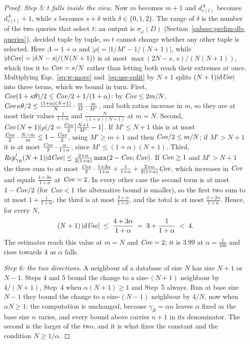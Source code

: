 \begin{proof}
\emph{Step 5: $t$ falls inside the view.}
Now $m$ becomes $m+1$ and $d^A_{v(t)}$ becomes $d^A_{v(t)}+1$, while $s$ becomes $s+\delta$ with
$\delta\in\{0,1,2\}$.
The range of $\delta$ is the number of the two queries that select $t$: an output is
$\sigma_\varphi(D)$ (Section~\ref{subsec:prelim-db-queries}), decided tuple by tuple, so $t$
cannot change whether any other tuple is selected.
Here $\Lambda=1+\alpha$ and $|\rho|=|1/M'-1/(N+1)|$, while $|\mathrm{d}\mathit{Cov}|=|\delta N-s|/(N(N+1))$
is at most $\max(2N-s,\,s)/(N(N+1))$, which ties it to $\mathit{Cov}=s/N$ rather than letting both reach
their extremes at once.
Multiplying Eqs.~\eqref{eq:w-move} and~\eqref{eq:use-split} by $N+1$ splits
$(N+1)|\mathrm{d}\mathit{Use}|$ into three terms, which we bound in turn.
First, $\mathit{Cov}(1+\kappa\theta)/2\le\mathit{Cov}/2+1/(1+\alpha)$: by $\mathit{Cov}\le2m/N$,
$\mathit{Cov}\,\kappa\theta/2\le\frac{(1+\alpha)(N+1)}{N}\cdot\frac{m}{M}\cdot\frac{m}{M'}$, and both ratios
increase in $m$, so they are at most their values $\frac1{1+\alpha}$ and
$\frac{N}{(1+\alpha)(N+1)}$ at $m=N$.
Second, $\mathit{Cov}\,(N+1)|\rho|/2=\frac{\mathit{Cov}}{2}\big|\frac{N+1}{M'}-1\big|$.
If $M'\le N+1$ this is at most $\frac{\mathit{Cov}}{2}\cdot\frac{N-m}{m}\le1-\frac{\mathit{Cov}}{2}$, using
$M'\ge m+1$ and then $\mathit{Cov}/2\le m/N$; if $M'>N+1$ it is at most
$\frac{\mathit{Cov}}{2}\cdot\frac{\alpha}{1+\alpha}$, since $M'\le(1+\alpha)(N+1)$.
Third, $\mathit{Rep}'_{\gamma_R}(N+1)|\mathrm{d}\mathit{Cov}|\le\frac{2+\alpha}{2(1+\alpha)}\max(2-\mathit{Cov},\mathit{Cov})$.
If $\mathit{Cov}\ge1$ and $M'>N+1$ the three sum to at most
$\frac{\mathit{Cov}}{2}\cdot\frac{1+2\alpha}{1+\alpha}+\frac1{1+\alpha}+\frac{2+\alpha}{2(1+\alpha)}\mathit{Cov}$,
which increases in $\mathit{Cov}$ and equals $\frac{4+3\alpha}{1+\alpha}$ at $\mathit{Cov}=2$.
In every other case the second term is at most $1-\mathit{Cov}/2$ (for $\mathit{Cov}<1$ the alternative bound is
smaller), so the first two sum to at most $1+\frac1{1+\alpha}$, the third is at most
$\frac{2+\alpha}{1+\alpha}$, and the total is at most $\frac{4+2\alpha}{1+\alpha}$.
Hence, for every $N$,
\[
(N+1)\,|\mathrm{d}\mathit{Use}|\;\le\;\frac{4+3\alpha}{1+\alpha}\;=\;3+\frac{1}{1+\alpha}\;<\;4 .
\]
The estimates reach this value at $m=N$ and $\mathit{Cov}=2$; it is $3.99$ at $\alpha=\tfrac1{100}$ and
rises towards $4$ as $\alpha$ falls.

\emph{Step 6: the two directions.}
A neighbour of a database of size $N$ has size $N+1$ or $N-1$.
Steps 4 and 5 bound the change to a size-$(N+1)$ neighbour by $4/(N+1)$, Step~4 when
$\alpha(N+1)\ge1$ and Step~5 always.
Run at base size $N-1$ they bound the change to a size-$(N-1)$ neighbour by $4/N$, now
when $\alpha N\ge1$: the
computation is unchanged, because $\gamma_R=\alpha n$ leaves $\alpha$ fixed as the base size $n$
varies, and every bound above carries $n+1$ in its denominator.
The second is the larger of the two, and it is what fixes the constant and the
condition $N\ge1/\alpha$.
\end{proof}

